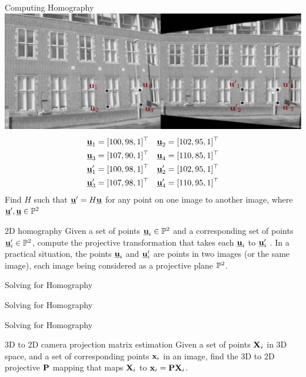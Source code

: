 \documentclass[times,t]{beamer}
\begin{document}
\begin{frame}{Computing Homography}
  \includegraphics[width=\linewidth]{media/removing-perspective-distortion.png.pdf}
  \begin{align*}
    \underline{\mathbf{u}}_1 &= [100, 98, 1]^\top&
    \underline{\mathbf{u}}_2 &= [102, 95, 1]^\top\\
    \underline{\mathbf{u}}_3 &= [107, 90, 1]^\top&
    \underline{\mathbf{u}}_4 &= [110, 85, 1]^\top \\
    \underline{\mathbf{u}}'_1 &= [100, 98, 1]^\top&
    \underline{\mathbf{u}}'_2 &= [102, 95, 1]^\top\\
    \underline{\mathbf{u}}'_3 &= [107, 98, 1]^\top&
    \underline{\mathbf{u}}'_4 &= [110, 95, 1]^\top
  \end{align*}
  Find $H$ such that $\underline{\mathbf{u}}' = H\underline{\mathbf{u}}$ for any point on one image to another
  image, where $\underline{\mathbf{u}}', \underline{\mathbf{u}} \in \mathbb{P}^2$
\end{frame}

\begin{frame}{2D homography}
  Given a set of points $\underline{\mathbf{u}}_i \in \mathbb{P}^2$ and a corresponding set of
  points $\underline{\mathbf{u}}'_i \in \mathbb{P}^2$, compute the projective transformation that takes each
  $\underline{\mathbf{u}}_i$ to $\underline{\mathbf{u}}'_i$ . In a practical situation, the points $\underline{\mathbf{u}}_i$ and   $\underline{\mathbf{u}}'_i$  are points in two images
  (or the same image), each image being considered as a projective plane  $\mathbb{P}^2$.
\end{frame}

\begin{frame}{Solving for Homography }
\end{frame}

\begin{frame}{Solving for Homography }
\end{frame}

\begin{frame}{Solving for Homography }
\end{frame}
\begin{frame}
\end{frame}

\begin{frame}{3D  to  2D camera projection matrix estimation}
  Given a set of points $\mathbf{X}_i$ in 3D space, and a set
  of corresponding points $\mathbf{x}_i$ in an image, find the 3D to 2D projective
  $\mathbf{P}$ mapping
  that maps $\mathbf{X}_i$ to $\mathbf{x}_i  =  \mathbf{P}\mathbf{X}_i$.
\end{frame}
\end{document}
